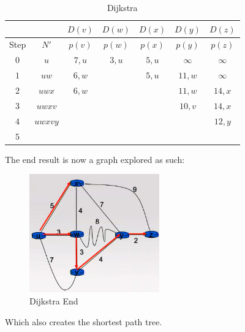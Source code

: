 \documentclass[a4paper]{article}
\theoremstyle{plain}
\theoremstyle{definition}
\newtheorem{exmp}{Example}[section]
\theoremstyle{remark}
\begin{document}
\begin{tcolorbox}[colback=black!3!white,breakable,enhanced,colframe=black!60!white,title=\begin{exmp}Dijkstra's Algorithm \label{Dijkstra's Algorithm}\end{exmp}]
\begin{table}[H]
	\centering
	\caption{Dijkstra}
	\label{tab:dijkstra}
	\begin{tabular}{|c|c|c|c|c|c|c|}
		& & $D(v)$ & $D(w)$ & $D(x)$ & $D(y)$ & $D(z)$ \\
		\hline
	Step & $N'$ & $p(v)$ & $p(w)$ & $p(x)$ & $p(y)$ & $p(z)$\\
	\hline
	$0$ & $u$ & $7,u$ & $3,u$ & $5,u$ & $\infty$ & $\infty$ \\
	$1$ & $uw $ & $6,w$ & & $5,u$ & $11,w$ & $\infty$ \\
	$2$ & $uwx$ & $6,w$ & & &  $11,w$ & $14,x$ \\
	$3$ & $uwxv$ & & & & $10,v$ & $14,x$ \\
	$4$ & $uwxvy$ & & & & & $12,y$ \\
	$5$ & & & & & & \\
	\hline
	\end{tabular}
\end{table}
The end result is now a graph explored as such:
\begin{figure}[H]
	\centering
	\includegraphics[width=0.5\textwidth]{eightytwo.png}
	\caption{Dijkstra End}
	\label{fig:eightytwo-png}
\end{figure}
Which also creates the shortest path tree.
\end{tcolorbox}
\end{document}
